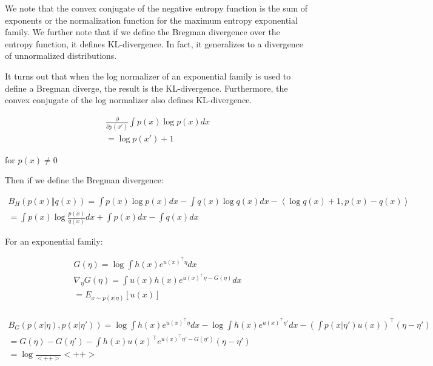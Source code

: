 \documentclass[a4paper]{article}
\begin{document}
We note that the convex conjugate of the negative entropy function is the sum of exponents or the normalization function for the maximum entropy exponential family.  We further note that if we define the Bregman divergence over the entropy function, it defines KL-divergence.  In fact, it generalizes to a divergence of unnormalized distributions.

It turns out that when the log normalizer of an exponential family is used to define a Bregman diverge, the result is the KL-divergence.  Furthermore, the convex conjugate of the log normalizer also defines KL-divergence.

\begin{equation}
  \begin{split}
    \frac{\partial}{\partial p(x')} \int p(x) \log p(x) dx \\
    = \log p(x') + 1
  \end{split}
  \label{}
\end{equation}

for $p(x) \neq 0$

Then if we define the Bregman divergence:

\begin{equation}
  \begin{split}
    B_H \left( p(x) \Vert q(x) \right) = \int p(x) \log p(x) dx - \int q(x) \log q(x) dx - \left< \log q(x) + 1, p(x) - q(x) \right> \\
    = \int p(x) \log \frac{p(x)}{q(x)} dx + \int p(x) dx - \int q(x) dx
  \end{split}
  \label{Bregman div of entropy}
\end{equation}

For an exponential family:

\begin{equation}
  \begin{split}
    G(\eta) = \log \int h(x) e^{ u(x)^\intercal \eta } dx \\
    \nabla_\eta G(\eta) = \int u(x) h(x) e^{ u(x)^\intercal \eta - G(\eta) } dx \\
    = E_{ x \sim p(x \vert \eta) } \left[ u(x) \right] \\
  \end{split}
  \label{}
\end{equation}

\begin{equation}
  \begin{split}
    B_G \left( p(x \vert \eta), p(x \vert \eta') \right) = \log \int h(x) e^{ u(x)^\intercal \eta } dx - \log \int h(x) e^{ u(x)^\intercal \eta' } dx - \left( \int p(x \vert \eta') u(x) \right)^\intercal \left( \eta - \eta' \right) \\
    = G(\eta) - G(\eta') - \int h(x) u(x)^\intercal e^{u(x)^\intercal \eta' - G(\eta') } (\eta - \eta') \\
    = \log \frac{}{<++>}<++>
  \end{split}
  \label{}
\end{equation}
\end{document}
